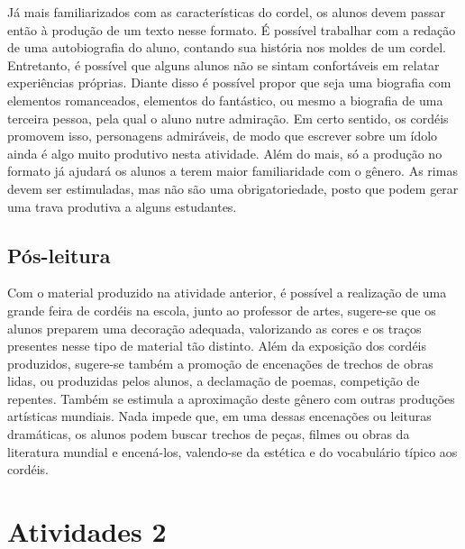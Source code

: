 \documentclass[12pt]{extarticle}
\begin{document}
Já mais familiarizados com as características do cordel, os
alunos devem passar então à produção de um texto nesse formato. É
possível trabalhar com a redação de uma autobiografia do aluno, contando
sua história nos moldes de um cordel. Entretanto, é possível que alguns
alunos não se sintam confortáveis em relatar experiências próprias.
Diante disso é possível propor que seja uma biografia com elementos
romanceados, elementos do fantástico, ou mesmo a biografia de uma
terceira pessoa, pela qual o aluno nutre admiração. Em certo sentido, os
cordéis promovem isso, personagens admiráveis, de modo que escrever
sobre um ídolo ainda é algo muito produtivo nesta atividade. Além do
mais, só a produção no formato já ajudará os alunos a terem maior
familiaridade com o gênero. As rimas devem ser estimuladas, mas não são
uma obrigatoriedade, posto que podem gerar uma trava produtiva a alguns
estudantes.

\subsection{Pós-leitura}


Com o material produzido na atividade anterior, é possível a
realização de uma grande feira de cordéis na escola, junto ao professor
de artes, sugere-se que os alunos preparem uma decoração adequada,
valorizando as cores e os traços presentes nesse tipo de material tão
distinto. Além da exposição dos cordéis produzidos, sugere-se também a
promoção de encenações de trechos de obras lidas, ou produzidas pelos
alunos, a declamação de poemas, competição de repentes. Também se
estimula a aproximação deste gênero com outras produções artísticas
mundiais. Nada impede que, em uma dessas encenações ou leituras
dramáticas, os alunos podem buscar trechos de peças, filmes ou obras da
literatura mundial e encená-los, valendo-se da estética e do vocabulário
típico aos cordéis.

\section{Atividades 2}

\end{document}
